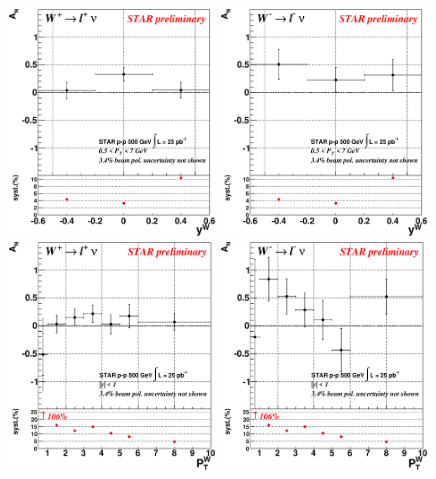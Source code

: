 \documentclass[12pt]{article}
\begin{document}
\begin{figure}[htbp]
  \centering
  \includegraphics[width=0.49\textwidth]{images/asymmetries/hd_Wp_AsymAmpSqrtVsRap.eps}
  \includegraphics[width=0.49\textwidth]{images/asymmetries/hd_Wm_AsymAmpSqrtVsRap.eps}
  \includegraphics[width=0.49\textwidth]{images/asymmetries/hd_Wp_AsymAmpSqrtVsPt.eps}
  \includegraphics[width=0.49\textwidth]{images/asymmetries/hd_Wm_AsymAmpSqrtVsPt.eps}

\end{figure}
\end{document}
